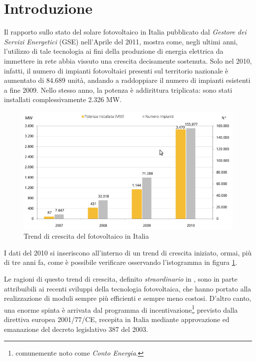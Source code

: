 \clearpage{\pagestyle{empty}\cleardoublepage}
\chapter*{Introduzione} 
%

%
Il rapporto sullo stato del solare fotovoltaico in 
Italia\cite{gse2010} pubblicato dal \emph{Gestore dei Servizi Energetici}
(GSE) nell'Aprile del 2011, mostra come, negli ultimi anni, 
l'utilizzo di tale tecnologia ai fini della produzione di energia
elettrica da immettere in rete abbia vissuto una crescita 
decisamente sostenuta.
%
Solo nel 2010, infatti, il numero di impianti fotovoltaici presenti
sul territorio nazionale \`e aumentato di 84.689 unit\`a, andando
a raddoppiare il numero di impianti esistenti a fine 2009.
%
Nello stesso anno, la potenza \`e addirittura triplicata: 
sono stati installati complessivamente 2.326 MW.
%

%
\begin{figure}[!h]
\centering
\includegraphics[width=350pt]{img/trend-fotovoltaico-italia.png}
\caption{Trend di crescita del fotovoltaico in Italia}
\label{fotovoltaico-italia}
\end{figure}
%

%
I dati del 2010 si inseriscono all'interno di un trend di crescita 
iniziato, ormai, pi\`u di tre anni fa, come \`e possibile verificare
osservando l'istogramma in figura \ref{fotovoltaico-italia}.
%

%
Le ragioni di questo trend di crescita, definito \emph{straordinario} in 
\cite{gse2010}, sono in parte attribuibili ai recenti sviluppi della
tecnologia fotovoltaica, che hanno portato alla realizzazione di moduli
sempre pi\`u efficienti e sempre meno costosi.
%
D'altro canto, una enorme spinta \`e arrivata dal programma di
incentivazione\footnote{comunemente noto come \emph{Conto Energia}.} previsto dalla direttiva europea 2001/77/CE, recepita in 
Italia mediante approvazione ed emanazione del decreto legislativo 387 
del 2003\cite{camera2003}.

